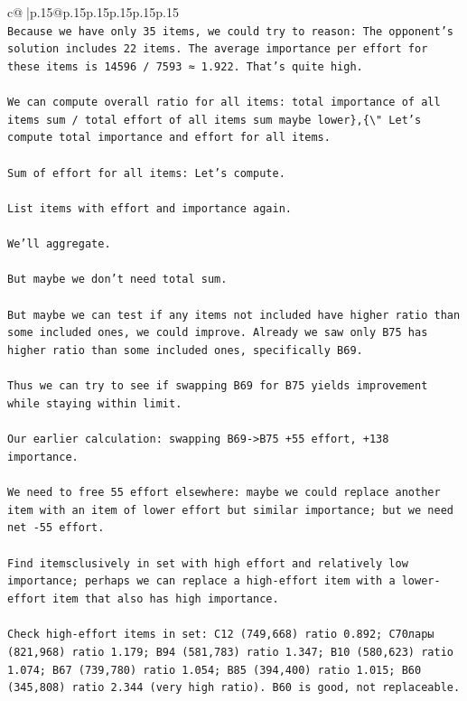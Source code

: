 \documentclass{article}
\begin{document}
{\begin{supertabular}{c@{$\;$}|p{.15\linewidth}@{}p{.15\linewidth}p{.15\linewidth}p{.15\linewidth}p{.15\linewidth}p{.15\linewidth}}
{{{\\ 
\texttt{Because we have only 35 items, we could try to reason: The opponent's solution includes 22 items. The average importance per effort for these items is 14596 / 7593 ≈ 1.922. That's quite high.} \\
\\ 
\texttt{We can compute overall ratio for all items: total importance of all items sum / total effort of all items sum maybe lower\},\{\textbackslash{}" Let's compute total importance and effort for all items.} \\
\\ 
\texttt{Sum of effort for all items: Let's compute.} \\
\\ 
\texttt{List items with effort and importance again.} \\
\\ 
\texttt{We'll aggregate.} \\
\\ 
\texttt{But maybe we don't need total sum.} \\
\\ 
\texttt{But maybe we can test if any items not included have higher ratio than some included ones, we could improve. Already we saw only B75 has higher ratio than some included ones, specifically B69.} \\
\\ 
\texttt{Thus we can try to see if swapping B69 for B75 yields improvement while staying within limit.} \\
\\ 
\texttt{Our earlier calculation: swapping B69{-}>B75 +55 effort, +138 importance.} \\
\\ 
\texttt{We need to free 55 effort elsewhere: maybe we could replace another item with an item of lower effort but similar importance; but we need net {-}55 effort.} \\
\\ 
\texttt{Find itemsclusively in set with high effort and relatively low importance; perhaps we can replace a high{-}effort item with a lower{-}effort item that also has high importance.} \\
\\ 
\texttt{Check high{-}effort items in set: C12 (749,668) ratio 0.892; C70лары (821,968) ratio 1.179; B94 (581,783) ratio 1.347; B10 (580,623) ratio 1.074; B67 (739,780) ratio 1.054; B85 (394,400) ratio 1.015; B60 (345,808) ratio 2.344 (very high ratio). B60 is good, not replaceable.} \\
}}}
\end{supertabular}}
\end{document}
